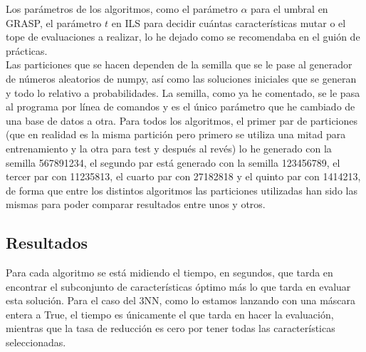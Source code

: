 \documentclass[12pt]{article}
\begin{document}
Los parámetros de los algoritmos, como el parámetro $\alpha$ para el umbral en GRASP, el parámetro $t$ en ILS para decidir cuántas características mutar o el tope de evaluaciones a realizar, lo he dejado como se recomendaba en el guión de prácticas.\\
Las particiones que se hacen dependen de la semilla que se le pase al generador de números aleatorios de numpy, así como las soluciones iniciales que se generan y todo lo relativo a probabilidades. La semilla, como ya he comentado, se le pasa al programa por línea de comandos y es el único parámetro que he cambiado de una base de datos a otra. Para todos los algoritmos, el primer par de particiones (que en realidad es la misma partición pero primero se utiliza una mitad para entrenamiento y la otra para test y después al revés) lo he generado con la semilla 567891234, el segundo par está generado con la semilla 123456789, el tercer par con 11235813, el cuarto par con 27182818 y el quinto par con 1414213, de forma que entre los distintos algoritmos las particiones utilizadas han sido las mismas para poder comparar resultados entre unos y otros.

\subsection{Resultados}

Para cada algoritmo se está midiendo el tiempo, en segundos, que tarda en encontrar el subconjunto de características óptimo más lo que tarda en evaluar esta solución. Para el caso del 3NN, como lo estamos lanzando con una máscara entera a True, el tiempo es únicamente el que tarda en hacer la evaluación, mientras que la tasa de reducción es cero por tener todas las características seleccionadas.
\end{document}
